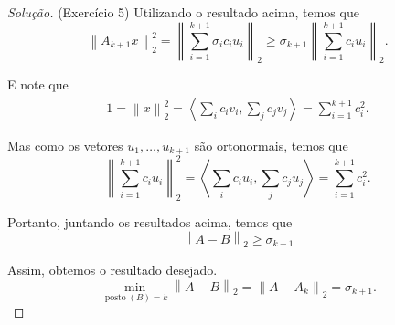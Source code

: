 \documentclass[a4paper,10pt]{article}
\newenvironment{solution}
  {\begin{proof}[Solução]}
  {\end{proof}}
\newcommand{\norm}[1]{\left\lVert#1\right\rVert}
\DeclareMathOperator{\posto}{posto}
\begin{document}
\begin{solution}{(Exercício 5)}
    Utilizando o resultado acima, temos que
    \begin{equation*}
      \norm{A_{k+1}x}_2^2 = \norm{\sum_{i=1}^{k+1}\sigma_ic_iu_i}_2 \geq
      \sigma_{k+1} \norm{\sum_{i=1}^{k+1}c_iu_i}_2.
    \end{equation*}

    E note que
    \begin{equation*}
      \begin{split}
        1 = \norm{x}_2^2 = \left\langle \sum_i c_iv_i, \sum_j c_jv_j \right\rangle =
        \sum_{i=1}^{k+1}c_i^2.
      \end{split}
    \end{equation*}

    Mas como os vetores $u_1,\dots,u_{k+1}$ são ortonormais, temos que
    \begin{equation*}
      \norm{\sum_{i=1}^{k+1}c_iu_i}_2^2 = \left\langle \sum_i c_iu_i, \sum_j c_ju_j \right\rangle
      = \sum_{i=1}^{k+1}c_i^2.
    \end{equation*}

    Portanto, juntando os resultados acima, temos que
    \begin{equation*}
      \norm{A-B}_2 \geq \sigma_{k+1}
    \end{equation*}

    Assim, obtemos o resultado desejado.
    \begin{equation*}
        \min_{\posto(B) = k} \norm{A-B}_2 = \norm{A - A_k}_2 = \sigma_{k+1}.
    \end{equation*}
  \end{solution}
\end{document}

